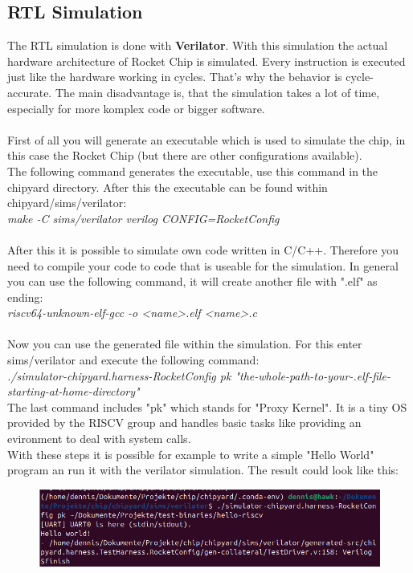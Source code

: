 \documentclass{article}
\begin{document}
{\subsection*{RTL Simulation}
The RTL simulation is done with \textbf{Verilator}. With this simulation the actual hardware architecture
of Rocket Chip is simulated. Every instruction is executed just like the hardware working in cycles. 
That's why the behavior is cycle-accurate. The main disadvantage is, that the simulation takes a lot of time, 
especially for more komplex code or bigger software.\\\\
First of all you will generate an executable which is used to simulate the chip, in this case the Rocket Chip (but there are other configurations available).\\
The following command generates the executable, use this command in the chipyard directory. After this the executable can be found 
within chipyard/sims/verilator:\\
\textit{make -C sims/verilator verilog CONFIG=RocketConfig}\\\\
After this it is possible to simulate own code written in C/C++. Therefore you need to compile 
your code to code that is useable for the simulation. In general you can use the following command, it will create another 
file with ".elf" as ending:\\
\textit{riscv64-unknown-elf-gcc -o <name>.elf <name>.c}\\\\
Now you can use the generated file within the simulation. For this enter sims/verilator and execute 
the following command:\\
\textit{./simulator-chipyard.harness-RocketConfig pk  "the-whole-path-to-your-.elf-file-starting-at-home-directory"}\\
The last command includes "pk" which stands for "Proxy Kernel". It is a tiny OS provided by the RISCV group and handles basic tasks like providing an 
evironment to deal with system calls.\\
With these steps it is possible for example to write a simple "Hello World" program an run it with the verilator simulation. The result could look like this:\\
\begin{figure}[h]
    \centering
    \includegraphics[scale=0.4]{testSuccess.png}

\end{figure}}
\end{document}
